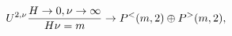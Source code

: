 \begin{equation}
U^{2,\nu} {{H\rightarrow 0,\nu \rightarrow\infty} \over
H\nu=m}\rightarrow P^<(m,2)\oplus P^>(m,2),
\end{equation}

